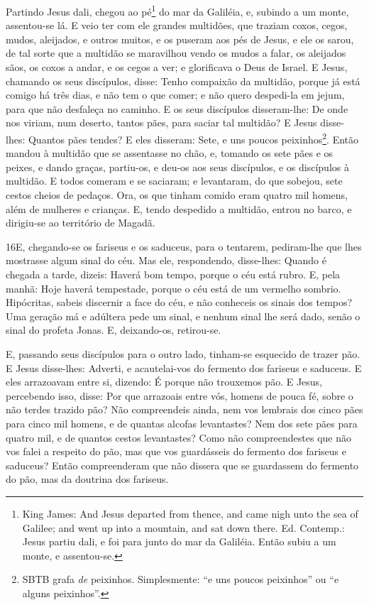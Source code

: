 Partindo Jesus dali, chegou ao pé\footnote{King James: And Jesus
departed from thence, and came nigh unto the sea of Galilee; and
went up into a mountain, and sat down there. Ed. Contemp.: Jesus
partiu dali, e foi para junto do mar da Galiléia. Então subiu a um
monte, e assentou-se.} do mar da Galiléia, e, subindo a um monte,
as\-sen\-tou-se lá. E veio ter com ele grandes multidões, que
traziam coxos, cegos, mudos, aleijados, e outros muitos, e os
puseram aos pés de Jesus, e ele os sarou, de tal sorte que a
multidão se maravilhou vendo os mudos a falar, os aleijados sãos, os
coxos a andar, e os cegos a ver; e glorificava o Deus de Israel.
E Jesus, chamando os seus discípulos, disse: Tenho compaixão
da multidão, porque já está comigo há três dias, e não tem o que
comer; e não quero despedi-la em jejum, para que não desfaleça no
caminho. E os seus discípulos disseram-lhe: De onde nos
viriam, num deserto, tantos pães, para saciar tal multidão? E
Jesus disse-lhes: Quantos pães tendes? E eles disseram: Sete, e uns
poucos peixinhos\footnote{SBTB grafa \emph{de} peixinhos.
Simplesmente: ``e uns poucos peixinhos'' ou ``e alguns
peixinhos''.}. Então mandou à multidão que se assentasse no
chão, e, tomando os sete pães e os peixes, e dando graças,
partiu-os, e deu-os aos seus discípulos, e os discípulos à multidão.
E todos comeram e se saciaram; e levantaram, do que sobejou,
sete cestos cheios de pedaços. Ora, os que tinham comido eram
quatro mil homens, além de mulheres e crianças. E, tendo
despedido a multidão, entrou no barco, e dirigiu-se ao território de
Magadã.

\medskip

\lettrine{16} E, chegando-se os fariseus e os saduceus, para o
tentarem, pe\-di\-ram-lhe que lhes mostrasse algum sinal do céu. Mas
ele, respondendo, disse-lhes: Quando é chegada a tarde, dizeis:
Haverá bom tempo, porque o céu está rubro. E, pela manhã: Hoje
haverá tempestade, porque o céu está de um vermelho sombrio.
Hipócritas, sabeis discernir a face do céu, e não conheceis os
sinais dos tempos? Uma geração má e adúltera pede um sinal, e
nenhum sinal lhe será dado, senão o sinal do profeta Jonas. E,
deixando-os, retirou-se.

E, passando seus discípulos para o outro lado, tinham-se esquecido
de trazer pão. E Jesus disse-lhes: Adverti, e acautelai-vos do
fermento dos fariseus e saduceus. E eles arrazoavam entre si,
dizendo: É porque não trouxemos pão. E Jesus, percebendo isso,
disse: Por que arrazoais entre vós, homens de pouca fé, sobre o não
terdes trazido pão? Não compreendeis ainda, nem vos lembrais dos
cinco pães para cinco mil homens, e de quantas alcofas levantastes?
Nem dos sete pães para quatro mil, e de quantos cestos
levantastes? Como não compreendestes que não vos falei a
respeito do pão, mas que vos guardásseis do fermento dos fariseus e
saduceus? Então compreenderam que não dissera que se
guardassem do fermento do pão, mas da doutrina dos fariseus.

